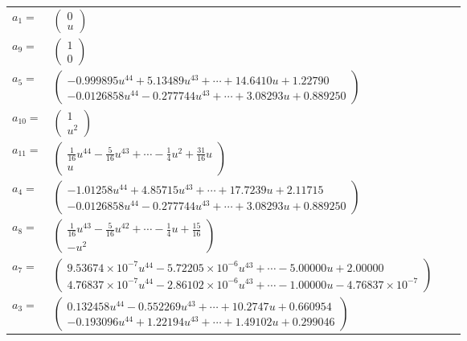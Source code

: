 \documentclass[1p]{elsarticle_modified}
\theoremstyle{definition}
\begin{document}
\begin{tabular}{m{7pt} m{180pt} m{7pt} m{180pt} }
\flushright $a_{1}=$&$\begin{pmatrix}0\\u\end{pmatrix}$ \\
\flushright $a_{9}=$&$\begin{pmatrix}1\\0\end{pmatrix}$ \\
\flushright $a_{5}=$&$\begin{pmatrix}-0.999895 u^{44}+5.13489 u^{43}+\cdots+14.6410 u+1.22790\\-0.0126858 u^{44}-0.277744 u^{43}+\cdots+3.08293 u+0.889250\end{pmatrix}$ \\
\flushright $a_{10}=$&$\begin{pmatrix}1\\u^2\end{pmatrix}$ \\
\flushright $a_{11}=$&$\begin{pmatrix}\frac{1}{16} u^{44}-\frac{5}{16} u^{43}+\cdots-\frac{1}{4} u^2+\frac{31}{16} u\\u\end{pmatrix}$ \\
\flushright $a_{4}=$&$\begin{pmatrix}-1.01258 u^{44}+4.85715 u^{43}+\cdots+17.7239 u+2.11715\\-0.0126858 u^{44}-0.277744 u^{43}+\cdots+3.08293 u+0.889250\end{pmatrix}$ \\
\flushright $a_{8}=$&$\begin{pmatrix}\frac{1}{16} u^{43}-\frac{5}{16} u^{42}+\cdots-\frac{1}{4} u+\frac{15}{16}\\- u^2\end{pmatrix}$ \\
\flushright $a_{7}=$&$\begin{pmatrix}9.53674\times10^{-7} u^{44}-5.72205\times10^{-6} u^{43}+\cdots-5.00000 u+2.00000\\4.76837\times10^{-7} u^{44}-2.86102\times10^{-6} u^{43}+\cdots-1.00000 u-4.76837\times10^{-7}\end{pmatrix}$ \\
\flushright $a_{3}=$&$\begin{pmatrix}0.132458 u^{44}-0.552269 u^{43}+\cdots+10.2747 u+0.660954\\-0.193096 u^{44}+1.22194 u^{43}+\cdots+1.49102 u+0.299046\end{pmatrix}$ \\

\end{tabular}
\end{document}
